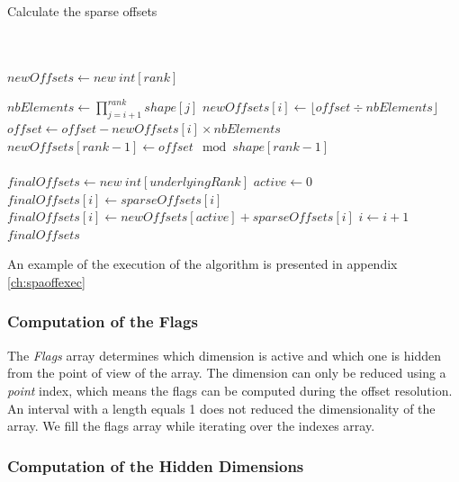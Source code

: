 \begin{algorithm}
	\caption{Calculate the sparse offsets}
	\label{alg:sparseOffsets}
\begin{algorithmic}
	\Statex
	\\
	\\
	\State $newOffsets\gets new\ int[rank]$ 
	
	\State $nbElements \gets \prod_{j=i+1}^{rank} shape[j]$
	\State $newOffsets[i] \gets \lfloor offset \div nbElements\rfloor$
	\State $offset \gets offset - newOffsets[i] \times nbElements$
	\EndFor
	\State $newOffsets[rank-1] \gets offset \mod shape[rank-1]$ 
	\\
	\\	
	\State $finalOffsets\gets new\ int[underlyingRank]$	
	\State $active\gets 0$
	 
	\State $finalOffsets[i] \gets sparseOffsets[i]$
	\Else
	\State $finalOffsets[i] \gets newOffsets[active] + sparseOffsets[i]$
	\State $i \gets i + 1$
	\EndIf
	\EndFor\\
	\Return $finalOffsets$
\EndProcedure
\end{algorithmic}
\end{algorithm}

An example of the execution of the algorithm is presented in appendix \ref{ch:spaoffexec}

\subsubsection{Computation of the Flags}
The \textit{Flags} array determines which dimension is active and which one is hidden from the point of view of the array. The \textbf{}dimension can only be reduced using a \textit{point} index, which means the flags can be computed during the offset resolution. An interval with a length equals 1 does not reduced the dimensionality of the array. We fill the flags array while iterating over the indexes array.

\subsubsection{Computation of the Hidden Dimensions}

